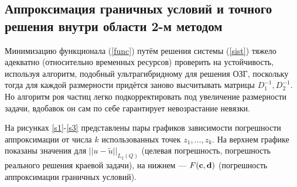 \documentclass[a4paper, 12pt]{article}
\begin{document}
\subsection{Аппроксимация граничных условий и точного решения внутри области 2-м методом}
Минимизацию функционала (\ref{func}) путём решения системы (\ref{sist}) тяжело адекватно (относительно временных ресурсов) проверить на устойчивость,
используя алгоритм, подобный ультрагибридному для решения ОЗГ, поскольку тогда для каждой размерности придётся заново высчитывать матрицы $D_1^{-1}, D_2^{-1}$.
Но алгоритм роя частиц легко подкорректировать под увеличение размерности задачи, вдобавок он сам по себе гарантирует невозрастание невязки.

На рисунках \ref{s1}-\ref{s3} представлены пары графиков зависимости погрешности аппроксимации от числа $k$ использованных точек $z_1,\dots, z_k$.
На верхнем графике показаны значения для $||u - \tilde{u} ||_{L_2(Q)}$ (целевая погрешность, погрешность реального решения краевой задачи), на нижнем --- $F({\bf c},{\bf d})$ (погрешность аппроксимации граничных условий).
\end{document}
